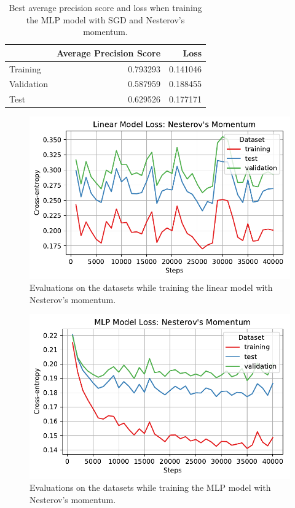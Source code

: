 \documentclass[letterpaper,11pt]{article}
\begin{document}
    \begin{table}
      \centering
      \begin{tabular}{lrr}
        \toprule
        {} &  Average Precision Score &      Loss \\
        \midrule
        Training   &                 0.793293 &  0.141046 \\
        Validation &                 0.587959 &  0.188455 \\
        Test       &                 0.629526 &  0.177171 \\
        \bottomrule
      \end{tabular}
      \caption{Best average precision score and loss when training the MLP
        model with SGD and Nesterov's momentum.}
    \label{tab:mlp_nesterov}
  \end{table}


  \begin{figure}
    \centering
    \includegraphics{problem4/linear_loss_nesterov.pdf}
    \caption{Evaluations on the datasets while training the linear model with
      Nesterov's momentum.}
    \label{fig:linear_loss_nesterov}
  \end{figure}

    \begin{figure}
    \centering
    \includegraphics{problem4/mlp_loss_nesterov.pdf}
    \caption{Evaluations on the datasets while training the MLP model with
      Nesterov's momentum.}
    \label{fig:mlp_loss_nesterov}
  \end{figure}
\end{document}
